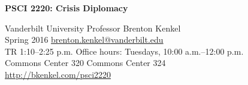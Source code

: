 \documentclass[12pt,svgnames]{article}
\begin{document}
{\Huge \textsf{\textbf{PSCI 2220: Crisis Diplomacy}}}

\textsf{%
  Vanderbilt University \hfill Professor Brenton Kenkel \\
  Spring 2016 \hfill \href{mailto:brenton.kenkel@vanderbilt.edu}{brenton.kenkel@vanderbilt.edu} \\
  TR 1:10--2:25 p.m. \hfill Office hours: Tuesdays, 10:00 a.m.--12:00 p.m. \\
  Commons Center 320 \hfill Commons Center 324 \\
  \url{http://bkenkel.com/psci2220}
}

\bigskip


\end{document}
